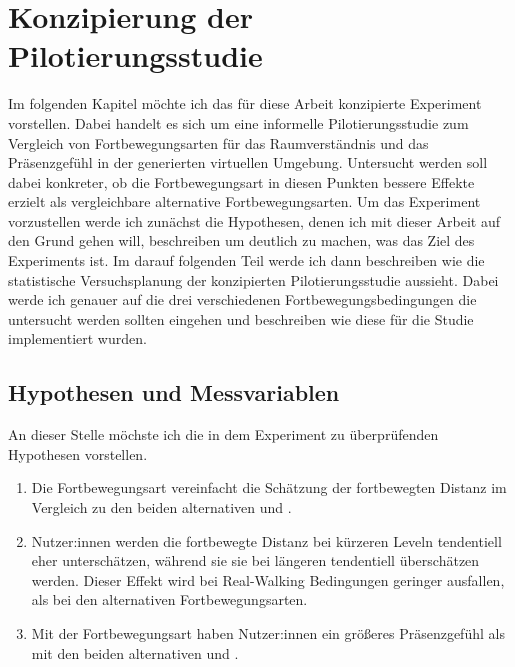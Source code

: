 \chapter{Konzipierung der Pilotierungsstudie}\label{chapter:experiment}
    Im folgenden Kapitel möchte ich das für diese Arbeit konzipierte Experiment vorstellen. Dabei handelt es sich um eine informelle Pilotierungsstudie zum Vergleich von Fortbewegungsarten für das Raumverständnis und das Präsenzgefühl in der generierten virtuellen Umgebung. Untersucht werden soll dabei konkreter, ob die Fortbewegungsart  in diesen Punkten bessere Effekte erzielt als vergleichbare alternative Fortbewegungsarten.
    Um das Experiment vorzustellen werde ich zunächst die Hypothesen, denen ich mit dieser Arbeit auf den Grund gehen will, beschreiben um deutlich zu machen, was das Ziel des Experiments ist.
    Im darauf folgenden Teil werde ich dann beschreiben wie die statistische Versuchsplanung der konzipierten Pilotierungsstudie aussieht. Dabei werde ich genauer auf die drei verschiedenen Fortbewegungsbedingungen die untersucht werden sollten eingehen und beschreiben wie diese für die Studie implementiert wurden.

    \section{Hypothesen und Messvariablen}
        An dieser Stelle möchste ich die in dem Experiment zu überprüfenden Hypothesen vorstellen.

        \begin{enumerate}
            \item Die  Fortbewegungsart vereinfacht die Schätzung der fortbewegten Distanz im Vergleich zu den beiden alternativen  und .

            \item Nutzer:innen werden die fortbewegte Distanz bei kürzeren Leveln tendentiell eher unterschätzen, während sie sie bei längeren tendentiell überschätzen werden. Dieser Effekt wird bei Real-Walking Bedingungen geringer ausfallen, als bei den alternativen Fortbewegungsarten.

            \item Mit der  Fortbewegungsart haben Nutzer:innen ein größeres Präsenzgefühl als mit den beiden alternativen  und .
        \end{enumerate}

